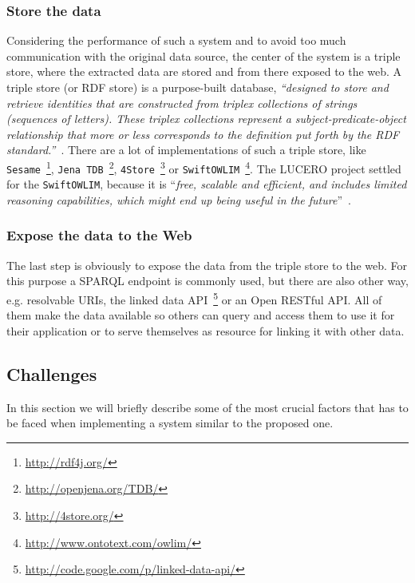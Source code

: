 {\subsubsection{Store the data}\label{subsubsec:store}
Considering the performance of such a system and to avoid too much communication with the original data source, the center of the system is a triple store, where the extracted data are stored and from there exposed to the web. A triple store (or RDF store) is a purpose-built database, \textit{``designed to store and retrieve identities that are constructed from triplex collections of strings (sequences of letters). These triplex collections represent a subject-predicate-object relationship that more or less corresponds to the definition put forth by the RDF standard.''}~\citet{url:triplestore}. There are a lot of implementations of such a triple store, like 
\texttt{Sesame}~\footnote{\url{http://rdf4j.org/}}, 
\texttt{Jena TDB}~\footnote{\url{http://openjena.org/TDB/}}, 
\texttt{4Store}~\footnote{\url{http://4store.org/}} or 
\texttt{SwiftOWLIM}~\footnote{\url{http://www.ontotext.com/owlim/}}. The LUCERO project settled for the \texttt{SwiftOWLIM}, because it is ``\textit{free, scalable and efficient, and includes limited reasoning capabilities, which might end up being useful in the future}''~\citet{url:lucero-tabloid}.

\subsubsection{Expose the data to the Web}\label{subsubsec:provision}
The last step is obviously to expose the data from the triple store to the web. For this purpose a SPARQL endpoint is commonly used, but there are also other way, e.g. resolvable URIs, the linked data API~\footnote{\url{http://code.google.com/p/linked-data-api/}} or an Open RESTful API. All of them make the data available so others can query and access them to use it for their application or to serve themselves as resource for linking it with other data.

\subsection{Challenges}\label{subsec:tec_challenges}
In this section we will briefly describe some of the most crucial factors that has to be faced when implementing a system similar to the proposed one.

}
